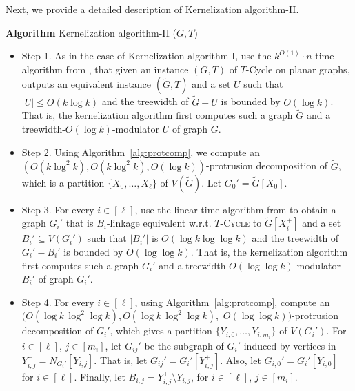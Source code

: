 \documentclass{article}
\numberwithin{claimcounter}{lemma}
\newcommand{\tcycle}{$T$-\textsc{Cycle}\xspace}
\begin{document}
Next, we provide a detailed description of {\sc Kernelization algorithm-II}.

\noindent
{\bf Algorithm} {\sc Kernelization algorithm-II} ($G,T$)
\begin{itemize}
\item  Step 1. As in the case of {\sc Kernelization algorithm-I}, use the $k^{O(1)}\cdot n$-time algorithm from , that given an instance $(G,T)$ of {\sc $T$-Cycle} on planar graphs, outputs an equivalent instance $(\tilde{G},T)$  and  a set $U$ such that $|U|\leq O(k\log k)$ and the treewidth of $\tilde{G}-U$ is bounded by $O(\log k)$. That is, the kernelization algorithm first computes such a graph $\tilde{G}$ and a treewidth-$O(\log k)$-modulator $U$ of graph $\tilde{G}$. 

\item Step 2. Using Algorithm~\ref{alg:protcomp}, we compute an $(O(k \log^2 k), O(k \log^2 k), O(\log k))$-protrusion decomposition of $\tilde{G}$, which is a partition $\{X_0,\dots,X_\ell\}$ of $V(\tilde{G})$. Let $G_0' = \tilde{G}[X_0]$. 


\item Step 3.  For every $i\in [\ell]$, use the linear-time algorithm from  to obtain a graph $G_i'$  that is  $B_i$-linkage equivalent w.r.t. \tcycle to $\tilde{G}[X_i^+]$  and  a set $B_i' \subseteq V(G_i')$ such that $|B_i'|$ is  $ O(\log k\log \log k)$ and the treewidth of $G_i'-B_i'$ is bounded by $O(\log \log k)$. That is, the kernelization algorithm first computes such a graph $G_i'$ and a treewidth-$O(\log \log k)$-modulator $B_i'$ of graph $G_i'$. 

\item Step 4. For every $i \in [\ell]$, using Algorithm~\ref{alg:protcomp},  compute an $(O(\log k \, \log^2 \log k), O(\log k \, \log^2 \log k),$ $ O(\log \log k))$-protrusion decomposition of $G_i'$, which gives a partition $\{Y_{i,0},\dots,Y_{i,m_i}\}$ of $V(G_i')$. For $i \in [\ell]$, $j \in [m_i]$,  let $G_{ij}'$ be the subgraph of $G_i'$   induced  by vertices in $Y_{i,j}^+ = N_{G_{i}'}[Y_{i,j}]$. That is, let $G_{ij}' = G_i'[Y_{i,j}^+] $. Also, let  $G_{i,0}' = G_i'[Y_{i,0}]$ for $i \in [\ell]$.
Finally, let $B_{i,j} = Y_{i,j}^+ \setminus Y_{i,j}$, for $i \in [\ell]$, $j \in [m_i]$.


\end{itemize}
\end{document}
